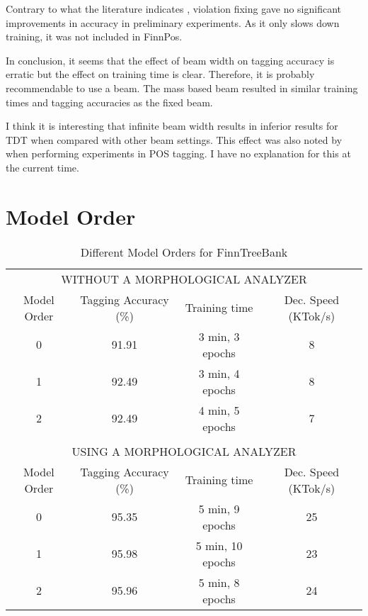Contrary to what the literature indicates
\citep{Huang2012,Collins2004}, violation fixing gave no significant
improvements in accuracy in preliminary experiments. As it only slows
down training, it was not included in FinnPos.

In conclusion, it seems that the effect of beam width on tagging
accuracy is erratic but the effect on training time is
clear. Therefore, it is probably recommendable to use a beam. The mass
based beam resulted in similar training times and tagging accuracies
as the fixed beam. 

I think it is interesting that infinite beam width results in inferior
results for TDT when compared with other beam settings. This effect
was also noted by \cite{Huang2012} when performing experiments in POS
tagging. I have no explanation for this at the current time.

\section{Model Order}

\begin{table}[htb!]
\begin{center}
\begin{tabular}{c|c|c|c}
\multicolumn{4}{c}{{\small\uppercase{Without a Morphological Analyzer}}}\\
\noalign{\smallskip}
\hline
Model Order & Tagging Accuracy (\%) & Training time & Dec. Speed (KTok/s)\\
\hline
0        & 91.91            & 3 min, 3 epochs            & 8            \\
1        & 92.49            & 3 min, 4 epochs            & 8            \\
2        & 92.49            & 4 min, 5 epochs            & 7            \\
\multicolumn{4}{c}{ }\\%
\multicolumn{4}{c}{{\small\uppercase{Using a Morphological Analyzer}}}\\
\noalign{\smallskip}
\hline
Model Order & Tagging Accuracy (\%) & Training time & Dec. Speed (KTok/s)\\
\hline
0        & 95.35            & 5 min, 9 epochs            & 25            \\
1        & 95.98            & 5 min, 10 epochs           & 23            \\
2        & 95.96            & 5 min, 8 epochs            & 24            \\
\end{tabular}
\caption{Different Model Orders for FinnTreeBank}
\end{center}
\end{table}

